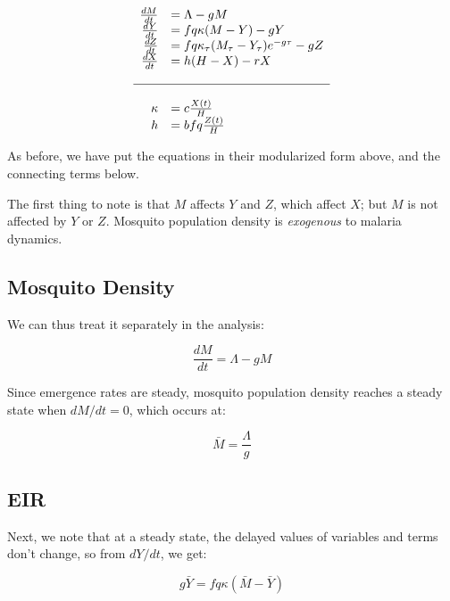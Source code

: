 \documentclass[
]{book}
\begin{document}
\begin{equation}
\begin{array}{rl}
\frac{dM}{dt} &= \Lambda - g M \\
\frac{dY}{dt} &= fq\kappa(M-Y) - g Y \\
\frac{dZ}{dt} &= fq\kappa_\tau(M_\tau-Y_\tau)e^{-g\tau} - g Z \\
\frac{dX}{dt} &= h (H-X) - rX  \\ \\ \hline \\ 
\kappa &= c \frac{X(t)}{H} \\
h &= b fq \frac{Z(t)}{H} \\
\end{array}
\end{equation}

As before, we have put the equations in their modularized form above, and the connecting terms below.

The first thing to note is that \(M\) affects \(Y\) and \(Z\), which affect \(X\); but \(M\) is not affected by \(Y\) or \(Z\). Mosquito population density is \emph{exogenous} to malaria dynamics.

\subsection{Mosquito Density}\label{mosquito-density}

We can thus treat it separately in the analysis:

\begin{equation}
\frac{dM}{dt} = \Lambda - g M 
\end{equation}

Since emergence rates are steady, mosquito population density reaches a steady state when \(dM/dt=0\), which occurs at:

\begin{equation}
\bar M = \frac{\Lambda}{g} 
\end{equation}

\subsection{EIR}\label{eir}

Next, we note that at a steady state, the delayed values of variables and terms don't change, so from \(dY/dt\), we get:

\begin{equation}
g \bar Y = fq\kappa(\bar M- \bar Y) 
\end{equation}
\end{document}
